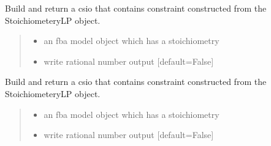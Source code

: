 \documentclass[letterpaper,12pt,english]{sphinxmanual}
\begin{document}
\begin{fulllineitems}

\pysigstartsignatures
\pysiglinewithargsret
{}
{\sphinxparamcomma {}}
{}
\pysigstopsignatures
\sphinxAtStartPar
Build and return a csio that contains constraint constructed from the StoichiometeryLP object.
\begin{quote}\begin{description}
\begin{itemize}
\item {} 
\sphinxAtStartPar
{} \textendash{} an fba model object which has a stoichiometry

\item {} 
\sphinxAtStartPar
{} \textendash{} write rational number output {[}default=False{]}

\end{itemize}

\end{description}\end{quote}

\end{fulllineitems}



\begin{fulllineitems}

\pysigstartsignatures
\pysiglinewithargsret
{}
{\sphinxparamcomma {}}
{}
\pysigstopsignatures
\sphinxAtStartPar
Build and return a csio that contains constraint constructed from the StoichiometeryLP object.
\begin{quote}\begin{description}
\begin{itemize}
\item {} 
\sphinxAtStartPar
{} \textendash{} an fba model object which has a stoichiometry

\item {} 
\sphinxAtStartPar
{} \textendash{} write rational number output {[}default=False{]}

\end{itemize}

\end{description}\end{quote}

\end{fulllineitems}
\end{document}

